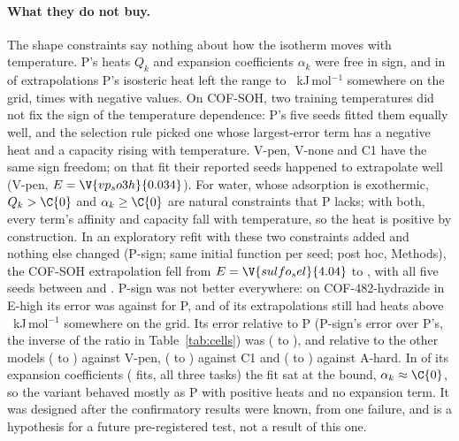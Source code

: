 \documentclass[journal=jcisd8,manuscript=article]{achemso}
\begin{document}
\paragraph{What they do not buy.} The shape constraints say nothing about how the isotherm moves with temperature.
P's heats $Q_k$ and expansion coefficients $\alpha_k$ were free in sign, and in  of 
extrapolations P's isosteric heat left the range  to ~kJ\,mol$^{-1}$ somewhere on the
grid,  times with negative values. On COF-SOH, two training temperatures did
not fix the sign of the temperature dependence: P's five seeds fitted them equally well, and the selection rule picked
one whose largest-error term has a negative heat and a capacity rising with temperature. V-pen, V-none and C1 have the
same sign freedom; on that fit their reported seeds happened to extrapolate well (V-pen, $E = \V{vp_so3h}{0.034}$).
For water, whose adsorption is exothermic, $Q_k > \C{0}$ and $\alpha_k \ge \C{0}$ are natural constraints that P
lacks; with both, every term's affinity and capacity fall with temperature, so the heat is positive by construction.
In an exploratory refit with these two constraints added and nothing else changed (P-sign; same initial function per
seed; post hoc, Methods), the COF-SOH extrapolation fell from $E = \V{sulfo_sel}{4.04}$ to
, with all five seeds between  and . P-sign was not better
everywhere: on COF-482-hydrazide in E-high its error was  against  for P, and
 of its  extrapolations still had heats above ~kJ\,mol$^{-1}$ somewhere on
the grid. Its error relative to P (P-sign's error over P's, the inverse of the ratio in Table~\ref{tab:cells}) was
 ( to ), and relative to the other models
 ( to ) against V-pen, 
( to ) against C1 and  ( to
) against A-hard. In  of its  expansion coefficients ( fits, all three tasks) the fit
sat at the bound, $\alpha_k \approx \C{0}$, so the variant behaved mostly as P with positive heats and no expansion
term. It was designed after the confirmatory results were known, from one failure, and is a hypothesis for a future
pre-registered test, not a result of this one.
\end{document}
